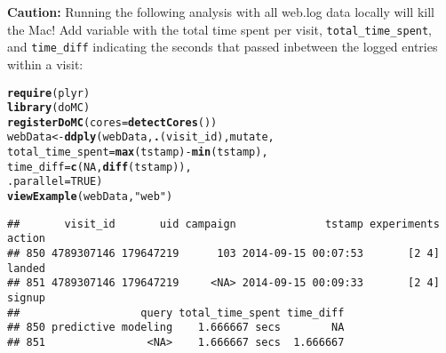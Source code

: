 \documentclass{article}\usepackage[]{graphicx}\usepackage[]{color}
\makeatletter
\newcommand{\hlnum}[1]{\textcolor[rgb]{0.686,0.059,0.569}{#1}}%
\newcommand{\hlstr}[1]{\textcolor[rgb]{0.192,0.494,0.8}{#1}}%
\newcommand{\hlopt}[1]{\textcolor[rgb]{0,0,0}{#1}}%
\newcommand{\hlstd}[1]{\textcolor[rgb]{0.345,0.345,0.345}{#1}}%
\newcommand{\hlkwb}[1]{\textcolor[rgb]{0.69,0.353,0.396}{#1}}%
\newcommand{\hlkwc}[1]{\textcolor[rgb]{0.333,0.667,0.333}{#1}}%
\newcommand{\hlkwd}[1]{\textcolor[rgb]{0.737,0.353,0.396}{\textbf{#1}}}%
\newenvironment{kframe}{%
 \def\at@end@of@kframe{}%
 \ifinner\ifhmode%
  \def\at@end@of@kframe{\end{minipage}}%
  \begin{minipage}{\columnwidth}%
 \fi\fi%
 \def\FrameCommand##1{\hskip\@totalleftmargin \hskip-\fboxsep
 \colorbox{shadecolor}{##1}\hskip-\fboxsep
     \hskip-\linewidth \hskip-\@totalleftmargin \hskip\columnwidth}%
 \MakeFramed {\advance\hsize-\width
   \@totalleftmargin\z@ \linewidth\hsize
   \@setminipage}}%
 {\par\unskip\endMakeFramed%
 \at@end@of@kframe}
\newenvironment{knitrout}{}{} %
\makeatother
\begin{document}
\textbf{Caution:} Running the following analysis with all web.log data locally will kill the Mac!
Add variable with the total time spent per visit, \verb+total_time_spent+, and \verb+time_diff+ indicating the seconds that passed inbetween the logged entries within a visit:
\begin{knitrout}
\color{fgcolor}\begin{kframe}
\begin{alltt}
\hlkwd{require}\hlstd{(plyr)}
\hlkwd{library}\hlstd{(doMC)}
\hlkwd{registerDoMC}\hlstd{(}\hlkwc{cores}\hlstd{=}\hlkwd{detectCores}\hlstd{())}
\hlstd{webData} \hlkwb{<-} \hlkwd{ddply}\hlstd{(webData,} \hlkwd{.}\hlstd{(visit_id), mutate,}
                 \hlkwc{total_time_spent}\hlstd{=}\hlkwd{max}\hlstd{(tstamp)}\hlopt{-}\hlkwd{min}\hlstd{(tstamp),}
                 \hlkwc{time_diff}\hlstd{=}\hlkwd{c}\hlstd{(}\hlnum{NA}\hlstd{,}\hlkwd{diff}\hlstd{(tstamp)),}
                 \hlkwc{.parallel}\hlstd{=}\hlnum{TRUE}\hlstd{)}
\hlkwd{viewExample}\hlstd{(webData,}\hlstr{"web"}\hlstd{)}
\end{alltt}
\begin{verbatim}
##       visit_id       uid campaign              tstamp experiments action
## 850 4789307146 179647219      103 2014-09-15 00:07:53       [2 4] landed
## 851 4789307146 179647219     <NA> 2014-09-15 00:09:33       [2 4] signup
##                   query total_time_spent time_diff
## 850 predictive modeling    1.666667 secs        NA
## 851                <NA>    1.666667 secs  1.666667
\end{verbatim}
\end{kframe}
\end{knitrout}
\end{document}
